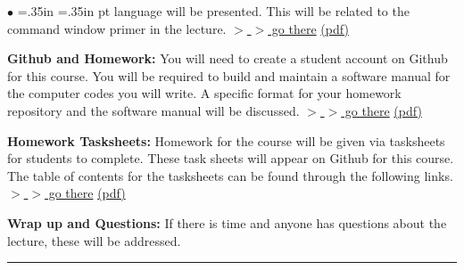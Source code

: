 \documentclass[10pt,fleqn]{article}
\begin{document}
\begin{list}{$\bullet$}{ \parsep=0pt \listparindent=0pt
\topsep=0pt \rightmargin=.35in \leftmargin=.35in  pt
\itemsep=2pt}
        language will be presented. This will be related to the command window
        primer in the lecture.
        \href{https://jvkoebbe.github.io/math4610/lectures/lecture_01/md/coding_example}{$>$ $>$ go there}
        \href{https://jvkoebbe.github.io/math4610/lectures/lecture_01/pdf/coding_example}{(pdf)}
  \item {\bf Github and Homework:} You will need to create a student account on
        Github for this course. You will be required to build and maintain a
        software manual for the computer codes you will write. A specific format
        for your homework repository and the software manual will be discussed.
        \href{https://jvkoebbe.github.io/math4610/lectures/lecture_01/md/github_primer}{$>$ $>$ go there}
        \href{https://jvkoebbe.github.io/math4610/lectures/lecture_01/pdf/github_primer.pdf}{(pdf)}
  \item {\bf Homework Tasksheets:} Homework for the course will be given via
        tasksheets for students to complete. These task sheets will appear on
        Github for this course. The table of contents for the tasksheets can be
        found through the following links.
        \href{https://jvkoebbe.github.io/math4610/tasksheets/md/toc_tasksheets}{$>$ $>$ go there}
        \href{https://jvkoebbe.github.io/math4610/tasksheets/pdf/toc_tasksheet.pdf}{(pdf)}
  \item {\bf Wrap up and Questions:} If there is time and anyone has questions
        about the lecture, these will be addressed.
\end{list}
\vskip0.1in\hrule\vskip0.1in
\end{document}
